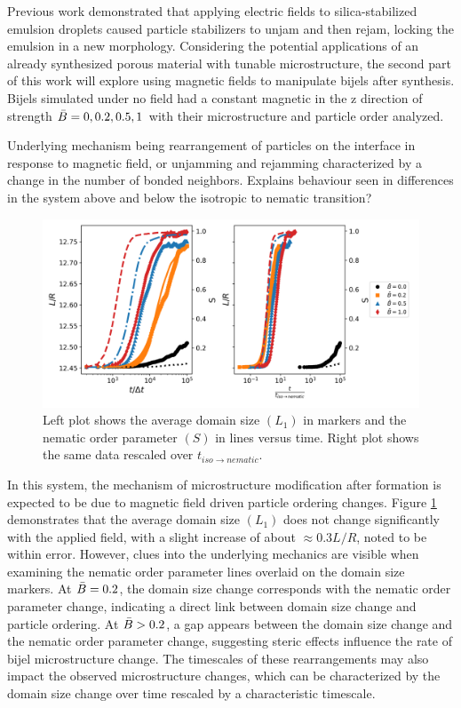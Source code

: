 Previous work demonstrated that applying electric fields to silica-stabilized emulsion droplets 
caused particle stabilizers to unjam and then rejam, locking the emulsion in a new morphology. 
\cite{cui_stabilizing_2013} Considering the potential applications of an already synthesized porous 
material with tunable microstructure, the second part of this work will explore using magnetic fields 
to manipulate bijels after synthesis. \cite{vanoli_bijels_2022, cha_bicontinuous_2019} Bijels simulated 
under no field had a constant magnetic in the z direction of strength $\Bar{B} = 0, 0.2, 0.5, 1$ with their
 microstructure and particle order analyzed.

Underlying mechanism being rearrangement of particles on the interface in response to magnetic field, or 
unjamming and rejamming characterized by a change in the number of bonded neighbors. Explains behaviour 
seen in differences in the system above and below the isotropic to nematic transition? 

\begin{figure}
    \centering
    \includegraphics[scale = 0.5]{figures/results/paper2/domain_size.png}
    \caption{Left plot shows the average domain size $(L_1)$ in markers and the nematic order parameter $(S)$ in lines versus time. Right plot shows the same data rescaled over $t_{iso \rightarrow nematic}$.}
    \label{fig:P2_domain_scaling}
\end{figure}

In this system, the mechanism of microstructure modification after formation is expected to be due to magnetic 
field driven particle ordering changes. Figure \ref{fig:P2_domain_scaling} demonstrates that the average domain 
size $(L_1)$ does not change significantly with the applied field, with a slight increase of about $\approx 0.3 L/R$, 
noted to be within error. However, clues into the underlying mechanics are visible when examining the nematic order 
parameter lines overlaid on the domain size markers. At $\Bar{B} = 0.2$, the domain size change corresponds with the 
nematic order parameter change, indicating a direct link between domain size change and particle ordering. 
At $\Bar{B} > 0.2$, a gap appears between the domain size change and the nematic order parameter change, suggesting 
steric effects influence the rate of bijel microstructure change. The timescales of these rearrangements may also 
impact the observed microstructure changes, which can be characterized by the domain size change over time rescaled 
by a characteristic timescale.

